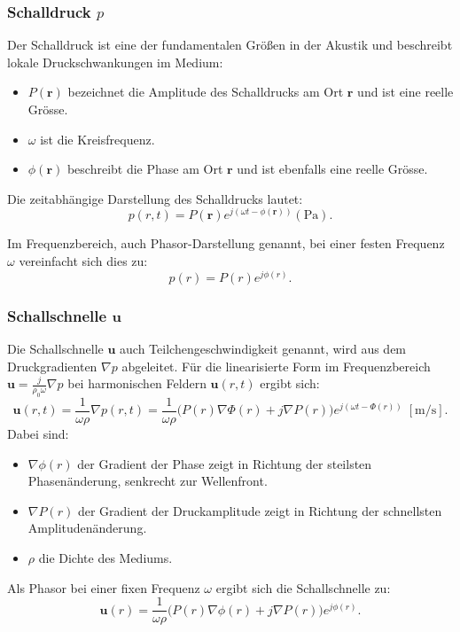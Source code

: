 \subsubsection{Schalldruck $p$}
 
Der Schalldruck ist eine der fundamentalen Größen in der Akustik und beschreibt lokale Druckschwankungen im Medium:
 
\begin{itemize}
\item $P  (\boldsymbol{r})$ bezeichnet die Amplitude des Schalldrucks am Ort $\boldsymbol{r}$ und ist eine reelle Grösse.
\item $\omega$ ist die Kreisfrequenz.
\item $\phi  (\boldsymbol{r})$ beschreibt die Phase am Ort $\boldsymbol{r}$ und ist ebenfalls eine reelle Grösse.
\end{itemize}
 
Die zeitabhängige Darstellung des Schalldrucks lautet:
\begin{equation}
p(r,t) = P(\boldsymbol{r})  e^{j( \omega t - \phi(\boldsymbol{r}))} (\si{\pascal}).
\end{equation}
 
Im Frequenzbereich, auch Phasor-Darstellung genannt, bei einer festen Frequenz $\omega$ vereinfacht sich dies zu:
\begin{equation}
p(r) = P(r)  e^{j \phi (r)}.
\label{helmholtz:PhasorSchalldruck}
\end{equation}
 
\subsubsection{Schallschnelle $\boldsymbol{u}$}
 
Die Schallschnelle $\boldsymbol{u}$ auch Teilchengeschwindigkeit genannt, wird aus dem Druckgradienten $\nabla p$ abgeleitet.
Für die linearisierte Form im Frequenzbereich $\boldsymbol{u} = \frac{j}{\rho_0 \omega} \nabla p$ bei harmonischen Feldern $\boldsymbol{u}(r,t)$ ergibt sich:
\begin{equation}
\boldsymbol{u}(r,t)
=
\frac{1}{\omega \rho} \nabla p(r,t)
=
\frac{1}{\omega \rho} \bigl( P(r) \nabla \Phi(r) + j\nabla P(r) \bigr)
e^{j(\omega t -\Phi(r))}\; [\si{\metre / \second}].
\end{equation}
Dabei sind:
\begin{itemize}
\item $\nabla \phi (r)$ der Gradient der Phase zeigt in Richtung der steilsten Phasenänderung, senkrecht zur Wellenfront.
\item $\nabla P (r)$ der Gradient der Druckamplitude zeigt in Richtung der schnellsten Amplitudenänderung.
\item $\rho$ die Dichte des Mediums.
\end{itemize}
Als Phasor bei einer fixen Frequenz $\omega$ ergibt sich die Schallschnelle zu:
\begin{equation}
\boldsymbol{u}(r)
=
\frac{1}{\omega \rho}  \bigl( P(r)  \nabla \phi(r) + j \nabla P(r) \bigr)
e^{j\phi (r)}.
\label{helmholtz:PhasorSchallschnelle}
\end{equation}
 
